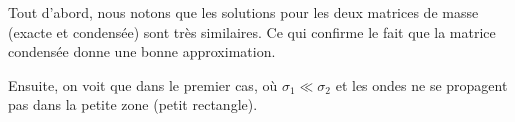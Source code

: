 \documentclass[12pt]{article}
\begin{document}
Tout d'abord, nous notons que les solutions pour les deux matrices de masse (exacte et condensée) sont très similaires. Ce qui confirme le fait que la matrice condensée donne une bonne approximation. 

Ensuite, on voit que dans le premier cas, où $\sigma_1 \ll \sigma_2$ et les ondes ne se propagent pas dans la petite zone (petit rectangle).
\end{document}
